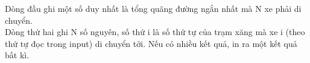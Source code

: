 Dòng đầu ghi một số duy nhất là tổng quãng đường ngắn nhất mà N xe phải di chuyển.   
\\   Dòng thứ hai ghi N số nguyên, số thứ i là số thứ tự của trạm xăng mà xe i (theo thứ tự đọc trong input) di chuyển tới. Nếu có nhiều kết quả, in ra một kết quả bất kì.